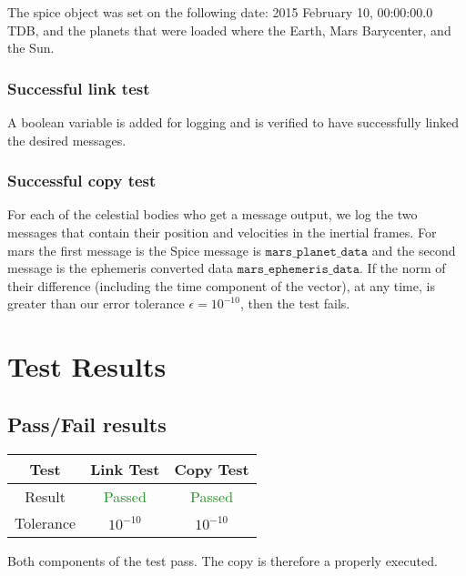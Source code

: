 \documentclass[]{BasiliskReportMemo}
\begin{document}
The spice object was set on the following date: 2015 February 10, 00:00:00.0 TDB, and the planets that were loaded where the Earth, Mars Barycenter, and the Sun.

\subsubsection*{Successful link test}

A boolean variable is added for logging and is verified to have successfully linked the desired messages.

\subsubsection*{Successful copy test}

For each of the celestial bodies who get a message output, we log the two messages that contain their position and velocities in the inertial frames. For mars the first message is the Spice message is $\texttt{mars$\_$planet$\_$data}$
and the second message is the ephemeris converted data $\texttt{mars$\_$ephemeris$\_$data}$. If the norm of their difference (including the time component of the vector), at any time, is greater than our error tolerance $\epsilon =10^{-10}$, then the test fails.


\section{Test Results}

\subsection{Pass/Fail results}

\begin{center}
\begin{tabular}{c|c|c}
Test & Link Test & Copy Test \\ \hline
Result &  \textcolor{ForestGreen}{Passed} &  \textcolor{ForestGreen}{Passed} \\ \hline
Tolerance & $10^{-10}$ & $10^{-10}$
\end{tabular}
\end{center}

Both components of the test pass. The copy is therefore a properly executed.
\end{document}
